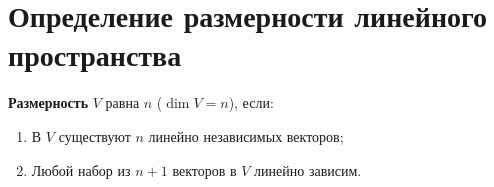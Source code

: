 \section{Определение размерности линейного пространства}

\begin{definition}
\textbf{Размерность} $V$ равна $n$ ($\dim V = n$), если:
\begin{enumerate}
    \item В $V$ существуют $n$ линейно независимых векторов;
    \item Любой набор из $n+1$ векторов в $V$ линейно зависим.
\end{enumerate}
\end{definition}
